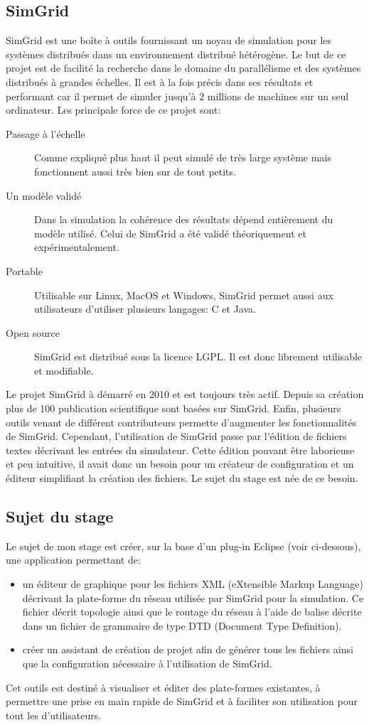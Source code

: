 \documentclass{article}
\begin{document}
	\subsection{SimGrid}
	SimGrid est une boîte à outils fournissant un noyau de simulation pour les systèmes distribués dans un environnement distribué hétérogène. Le but de ce projet est de facilité la recherche dans le domaine du parallélisme et des systèmes distribués à grandes échelles. Il est à la fois précis dans ses résultats et performant car il permet de simuler jusqu'à 2 millions de machines sur un seul ordinateur.
	Les principale force de ce projet sont:
	\begin{description}
		\item[Passage à l'échelle] Comme expliqué plus haut il peut simulé de très large système mais fonctionnent aussi très bien sur de tout petits.
		\item[Un modèle validé] Dans la simulation la cohérence des résultats dépend entièrement du modèle utilisé. Celui de SimGrid a été validé théoriquement et expérimentalement.
		\item[Portable] Utilisable sur Linux, MacOS et Windows, SimGrid permet aussi aux utilisateurs d'utiliser plusieurs langages: C et Java.
		\item[Open source] SimGrid est distribué sous la licence LGPL. Il est donc librement utilisable et modifiable.
	\end{description}
	Le projet SimGrid à démarré en 2010 et est toujours très actif. Depuis sa création plus de 100 publication scientifique sont basées sur SimGrid. Enfin, plusieurs outils venant de différent  contributeurs permette d'augmenter les fonctionnalités de SimGrid. 
	Cependant, l'utilisation de SimGrid passe par l'édition de fichiers textes décrivant les entrées du simulateur. Cette édition pouvant être laborieuse et peu intuitive, il avait donc un besoin pour un créateur de configuration et un éditeur simplifiant la création des fichiers. Le sujet du stage est née de ce besoin.

	\subsection{Sujet du stage}
		Le sujet de mon stage est créer, sur la base d'un plug-in Eclipse (voir ci-dessous), une application permettant de:
		\begin{itemize}
	 		\item un éditeur de graphique pour les fichiers XML (eXtensible Markup Language) décrivant la plate-forme du réseau utilisée par SimGrid pour la simulation. Ce fichier décrit topologie ainsi que le routage du réseau à l'aide de balise décrite dans un fichier de grammaire de type DTD (Document Type Definition).
	 		\item créer un assistant de création de projet afin de générer tous les fichiers ainsi que la configuration nécessaire à l'utilisation de SimGrid.
		\end{itemize}
	Cet outils est destiné à visualiser et éditer des plate-formes existantes, à permettre une prise en main rapide de SimGrid et à faciliter son utilisation pour tout les d'utilisateurs.
\end{document}
